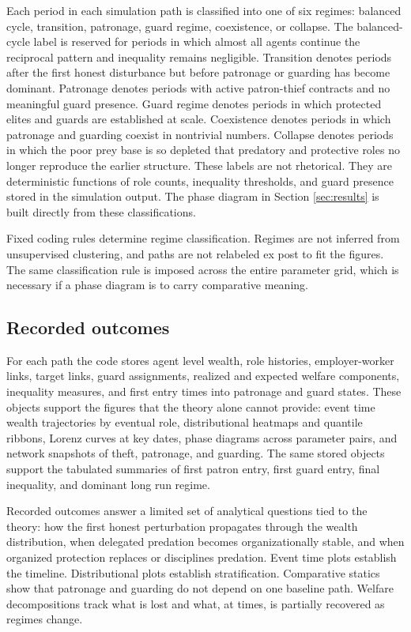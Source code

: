 Each period in each simulation path is classified into one of six regimes: balanced cycle, transition, patronage, guard regime, coexistence, or collapse. The balanced-cycle label is reserved for periods in which almost all agents continue the reciprocal pattern and inequality remains negligible. Transition denotes periods after the first honest disturbance but before patronage or guarding has become dominant. Patronage denotes periods with active patron-thief contracts and no meaningful guard presence. Guard regime denotes periods in which protected elites and guards are established at scale. Coexistence denotes periods in which patronage and guarding coexist in nontrivial numbers. Collapse denotes periods in which the poor prey base is so depleted that predatory and protective roles no longer reproduce the earlier structure. These labels are not rhetorical. They are deterministic functions of role counts, inequality thresholds, and guard presence stored in the simulation output. The phase diagram in Section \ref{sec:results} is built directly from these classifications.

Fixed coding rules determine regime classification. Regimes are not inferred from unsupervised clustering, and paths are not relabeled ex post to fit the figures. The same classification rule is imposed across the entire parameter grid, which is necessary if a phase diagram is to carry comparative meaning.

\subsection{Recorded outcomes}

For each path the code stores agent level wealth, role histories, employer-worker links, target links, guard assignments, realized and expected welfare components, inequality measures, and first entry times into patronage and guard states. These objects support the figures that the theory alone cannot provide: event time wealth trajectories by eventual role, distributional heatmaps and quantile ribbons, Lorenz curves at key dates, phase diagrams across parameter pairs, and network snapshots of theft, patronage, and guarding. The same stored objects support the tabulated summaries of first patron entry, first guard entry, final inequality, and dominant long run regime.

Recorded outcomes answer a limited set of analytical questions tied to the theory: how the first honest perturbation propagates through the wealth distribution, when delegated predation becomes organizationally stable, and when organized protection replaces or disciplines predation. Event time plots establish the timeline. Distributional plots establish stratification. Comparative statics show that patronage and guarding do not depend on one baseline path. Welfare decompositions track what is lost and what, at times, is partially recovered as regimes change.
